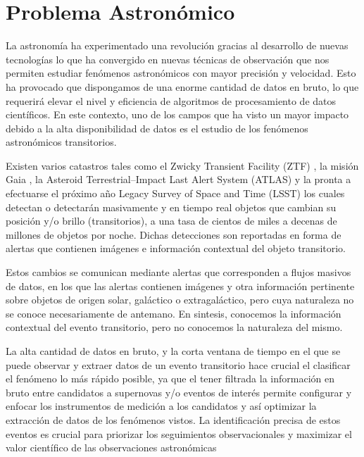 \documentclass[../tesis.tex]{subfiles}
\begin{document}
\section{Problema Astronómico} \label{introduction:astronomic-problem}

La astronomía ha experimentado una revolución gracias al desarrollo de nuevas tecnologías lo que ha convergido en nuevas técnicas de observación que nos permiten estudiar fenómenos astronómicos con mayor precisión y velocidad. Esto ha provocado que dispongamos de una enorme cantidad de datos en bruto, lo que requerirá elevar el nivel y eficiencia de algoritmos de procesamiento de datos científicos. En este contexto, uno de los campos que ha visto un mayor impacto debido a la alta disponibilidad de datos es el estudio de los fenómenos astronómicos transitorios.\par\null\par

Existen varios catastros tales como el Zwicky Transient Facility (ZTF) \cite{Bellm2018}, la misión Gaia \cite{gaia}, la Asteroid Terrestrial–Impact Last Alert System (ATLAS) \cite{atlas} y la pronta a efectuarse el próximo año Legacy Survey of Space and Time (LSST) \cite{lsst} los cuales detectan o detectarán masivamente y en tiempo real objetos que cambian su posición y/o brillo (transitorios), a una tasa de cientos de miles a decenas de millones de objetos por noche. Dichas detecciones son reportadas en forma de alertas que contienen imágenes e información contextual del objeto transitorio.\par\null\par

Estos cambios se comunican mediante alertas que corresponden a flujos masivos de datos, en los que las alertas contienen imágenes y otra información pertinente sobre objetos de origen solar, galáctico o extragaláctico, pero cuya naturaleza no se conoce necesariamente de antemano. En sintesis, conocemos la información contextual del evento transitorio, pero no conocemos la naturaleza del mismo.\par\null\par

La alta cantidad de datos en bruto, y la corta ventana de tiempo en el que se puede observar y extraer datos de un evento transitorio hace crucial el clasificar el fenómeno lo más rápido posible, ya que el tener filtrada la información en bruto entre candidatos a supernovas y/o eventos de interés permite configurar y enfocar los instrumentos de medición a los candidatos y así optimizar la extracción de datos de los fenómenos vistos. La identificación precisa de estos eventos es crucial para priorizar los seguimientos observacionales y maximizar el valor científico de las observaciones astronómicas\par\null\par
\end{document}
